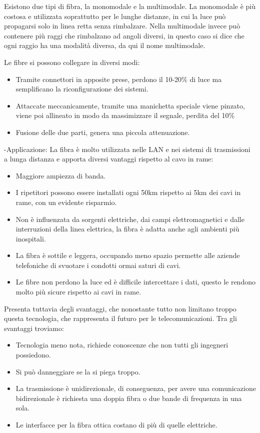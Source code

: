Esistono due tipi di fibra, la monomodale e la multimodale. La monomodale è più costosa e utilizzata soprattutto per le lunghe distanze, in cui la luce può propagarsi solo in linea retta senza rimbalzare.
Nella multimodale invece può contenere più raggi che rimbalzano ad angoli diversi, in questo caso si dice che ogni raggio ha una modalità diversa, da qui il nome multimodale.

Le fibre si possono collegare in diversi modi:
\begin{itemize}
\item Tramite connettori in apposite prese, perdono il 10-20\% di luce ma semplificano la riconfigurazione dei sistemi. 
\item Attaccate meccanicamente, tramite una manichetta speciale viene pinzato, viene poi allineato in modo da massimizzare il segnale, perdita del 10\% 
\item Fusione delle due parti, genera una piccola attenuazione.
\end{itemize}
-Applicazione: La fibra è molto utilizzata nelle LAN e nei sistemi di trasmissioni a lunga distanza e apporta diversi vantaggi rispetto al cavo in rame:
\begin{itemize}
\item	Maggiore ampiezza di banda.
\item	I ripetitori possono essere installati ogni 50km rispetto ai 5km dei cavi in rame, con un evidente risparmio.
\item	Non è influenzata da sorgenti elettriche, dai campi elettromagnetici e dalle interruzioni della linea elettrica, la fibra è adatta anche agli ambienti più inospitali.
\item	La fibra è sottile e leggera, occupando meno spazio permette alle aziende telefoniche di svuotare i condotti ormai saturi di cavi.
\item	Le fibre non perdono la luce ed è difficile intercettare i dati, questo le rendono molto più sicure rispetto ai cavi in rame.
\end{itemize}
Presenta tuttavia degli svantaggi, che nonostante tutto non limitano troppo questa tecnologia, che rappresenta il futuro per le telecomunicazioni. Tra gli svantaggi troviamo:
\begin{itemize}
\item	Tecnologia meno nota, richiede conoscenze che non tutti gli ingegneri possiedono.
\item	Si può danneggiare se la si piega troppo.
\item	La trasmissione è unidirezionale, di conseguenza, per avere una comunicazione bidirezionale è richiesta una doppia fibra o due bande di frequenza in una sola.
\item	Le interfacce per la fibra ottica costano di più di quelle elettriche.
\end{itemize}


